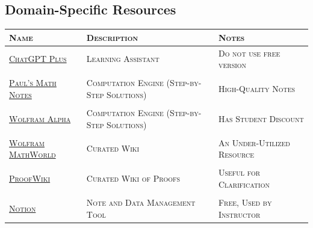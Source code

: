 \documentclass[letterpaper,twoside]{article}
\begin{document}
    \subsection*{Domain-Specific Resources}
    \begin{center}
        \onehalfspacing
        \begin{tabularx}{\columnwidth}{lll}
            \textsc{Name} & \textsc{Description} & \textsc{Notes}\\
            \hline
            \href{https://chat.openai.com}{\textsc{ChatGPT Plus}} & \textsc{Learning Assistant} & \textsc{Do not use free version}\\
            \\
            \href{https://tutorial.math.lamar.edu/Classes/Alg/Alg.aspx}{\textsc{Paul's Math Notes}} &\textsc{Computation Engine (Step-by-Step Solutions)} & \textsc{High-Quality Notes}\\
            \\
            \href{https://wolframalpha.com}{\textsc{Wolfram Alpha}} &\textsc{Computation Engine (Step-by-Step Solutions)} & \textsc{Has Student Discount}\\
            \\
            \href{https://mathworld.wolfram.com/}{\textsc{Wolfram MathWorld}} & \textsc{Curated Wiki} & \textsc{An Under-Utilized Resource}\\
            \\
            \href{https://proofwiki.org/wiki/Main_Page}{\textsc{ProofWiki}} & \textsc{Curated Wiki of Proofs} & \textsc{Useful for Clarification} \\
            \\
            \href{https://notion.so}{\textsc{Notion}} & \textsc{Note and Data Management Tool} & \textsc{Free, Used by Instructor} \\
        \end{tabularx}
    \end{center}
    
\end{document}
